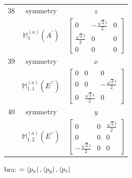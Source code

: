 \documentclass[fleqn,8pt,landscape]{jsarticle}
\begin{document}
\begin{longtable}{ccc}
$ 38 $ & $ \text{symmetry} $ & $ z $ \\
$  $ & $ \mathbb{M}_{1}^{(a)}(A^{\prime}) $ & $ \begin{bmatrix} 0 & - \frac{\sqrt{2} i}{2} & 0 \\ \frac{\sqrt{2} i}{2} & 0 & 0 \\ 0 & 0 & 0 \end{bmatrix} $ \\ \hline
$ 39 $ & $ \text{symmetry} $ & $ x $ \\
$  $ & $ \mathbb{M}_{1,1}^{(a)}(E^{\prime\prime}) $ & $ \begin{bmatrix} 0 & 0 & 0 \\ 0 & 0 & - \frac{\sqrt{2} i}{2} \\ 0 & \frac{\sqrt{2} i}{2} & 0 \end{bmatrix} $ \\ \hline
$ 40 $ & $ \text{symmetry} $ & $ y $ \\
$  $ & $ \mathbb{M}_{1,2}^{(a)}(E^{\prime\prime}) $ & $ \begin{bmatrix} 0 & 0 & \frac{\sqrt{2} i}{2} \\ 0 & 0 & 0 \\ - \frac{\sqrt{2} i}{2} & 0 & 0 \end{bmatrix} $ \\ \hline
\end{longtable}
bra: $=\bra{p_{x}}, \bra{p_{y}}, \bra{p_{z}}$
\end{document}
